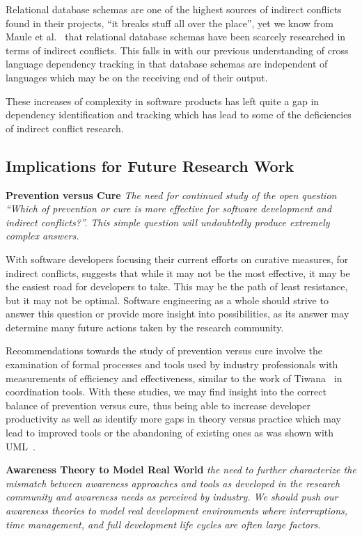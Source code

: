 \documentclass[conference]{IEEEtran}
\begin{document}
Relational database schemas are one of the highest sources of indirect
conflicts found in their projects, ``it breaks stuff all over the place'',
yet we know from Maule et al.~\cite{Maule:2008:IAD} that relational database schemas have
been scarcely researched in terms of indirect conflicts. This falls in with our previous understanding of cross language
dependency tracking in that database schemas are independent of languages which may be on the receiving end of their output.

These increases of complexity in software products has left quite a gap in dependency identification and tracking which
has lead to some of the deficiencies of indirect conflict research.

\subsection{Implications for Future Research Work}
\label{sec:implr}

\textbf{Prevention versus Cure} \textit{The need for continued study of the open question
``Which of prevention or cure is more effective for software development and indirect conflicts?''. This simple question will undoubtedly
produce extremely complex answers.}

With software developers focusing their current efforts on curative measures, for
indirect conflicts, suggests
that while it may not be the most effective, it may be the easiest road for developers to take. This may be the path of
least resistance, but it may not be optimal. Software engineering as a whole should strive to answer this question or
provide more insight into possibilities, as its answer may determine many future actions taken by the research community.

Recommendations towards the study of prevention versus cure involve the examination of formal processes and tools used
by industry professionals with measurements of efficiency and effectiveness, similar to the work of
Tiwana~\cite{Tiwana:2008:ICD} in coordination tools. With these studies, we may find insight into the correct balance
of prevention versus cure, thus being able to increase developer productivity as well as identify more gaps in theory
versus practice which may lead to improved tools or the abandoning of existing ones as was shown with UML~\cite{Petre:2013:UP}.

\textbf{Awareness Theory to Model Real World} \textit{the need to further characterize the
mismatch between awareness approaches and tools as developed in the research community and awareness needs as perceived
by industry. We should push our awareness theories to model real development
environments where interruptions, time management, and full development life cycles are often large factors.}
\end{document}
